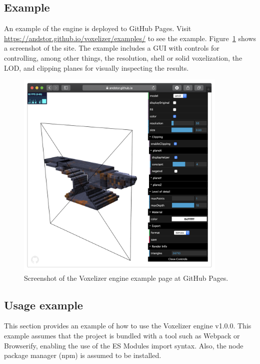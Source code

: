 \subsection{Example}
An example of the engine is deployed to GitHub Pages. Visit \url{https://andstor.github.io/voxelizer/examples/} to see the example. Figure~\ref{fig:voxelizer-example} shows a screenshot of the site. The example includes a GUI with controls for controlling, among other things, the resolution, shell or solid voxelization, the LOD, and clipping planes for visually inspecting the results.
\begin{figure}[ht]
    \centering
    \includegraphics[width=0.9\textwidth]{sections/result/figures/voxelizer-example.png}
    \caption{Screenshot of the Voxelizer engine example page at GitHub Pages.}
    \label{fig:voxelizer-example}
\end{figure}

\clearpage
\subsection{Usage example}
This section provides an example of how to use the Voxelizer engine v1.0.0. This example assumes that the project is bundled with a tool such as Webpack or Browserify, enabling the use of the ES Modules import syntax. Also, the node package manager (npm) is assumed to be installed.

